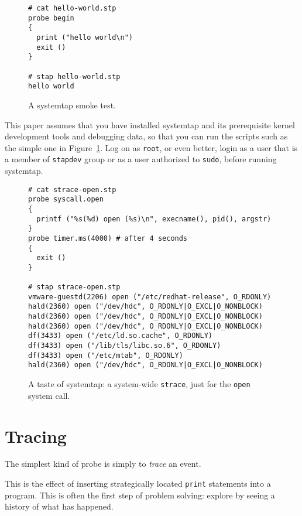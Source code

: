 \documentclass{article}
\newenvironment{boxedminipage}%
    {\begin{makeimage}\begin{center}\begin{Sbox}\begin{minipage}}%
    {\end{minipage}\end{Sbox}\fbox{\TheSbox}\end{center}\end{makeimage}}
\renewcommand{\nomenclature}[2]{}
\begin{document}
\begin{figure}[!ht]
\begin{boxedminipage}{4.5in}
\begin{verbatim}
# cat hello-world.stp
probe begin 
{
  print ("hello world\n")
  exit ()
}

# stap hello-world.stp
hello world
\end{verbatim}
\end{boxedminipage}
\label{fig:hello-world}
\caption{A systemtap smoke test.}
\end{figure}

This paper assumes that you have installed systemtap and its
prerequisite kernel development tools and debugging data, so that you
can run the scripts such as the simple one in
Figure~\ref{fig:hello-world}.  Log on as \verb+root+, or even better,
login as a user that is a member of \verb+stapdev+ group or as a
user authorized to \verb+sudo+, before running systemtap.

\begin{figure}[ht]
\begin{boxedminipage}{4.5in}
\begin{verbatim}
# cat strace-open.stp
probe syscall.open
{
  printf ("%s(%d) open (%s)\n", execname(), pid(), argstr) 
}
probe timer.ms(4000) # after 4 seconds
{
  exit ()
}

# stap strace-open.stp
vmware-guestd(2206) open ("/etc/redhat-release", O_RDONLY)
hald(2360) open ("/dev/hdc", O_RDONLY|O_EXCL|O_NONBLOCK)
hald(2360) open ("/dev/hdc", O_RDONLY|O_EXCL|O_NONBLOCK)
hald(2360) open ("/dev/hdc", O_RDONLY|O_EXCL|O_NONBLOCK)
df(3433) open ("/etc/ld.so.cache", O_RDONLY)
df(3433) open ("/lib/tls/libc.so.6", O_RDONLY)
df(3433) open ("/etc/mtab", O_RDONLY)
hald(2360) open ("/dev/hdc", O_RDONLY|O_EXCL|O_NONBLOCK)
\end{verbatim}
\end{boxedminipage}
\label{fig:strace-open}
\caption{A taste of systemtap: a system-wide {\tt strace}, just for
the {\tt open} system call.}
\end{figure}
\nomenclature{strace}{A standard ptrace-based command line tool to trace system call activity of a process.}

\section{Tracing}

The simplest kind of probe is simply to {\em trace} an event.
\nomenclature{trace}{A compact textual record of an event occurrence.}
This is the effect of inserting strategically located \verb+print+
statements into a program.  This is often the first step of problem
solving: explore by seeing a history of what has happened.
\end{document}
